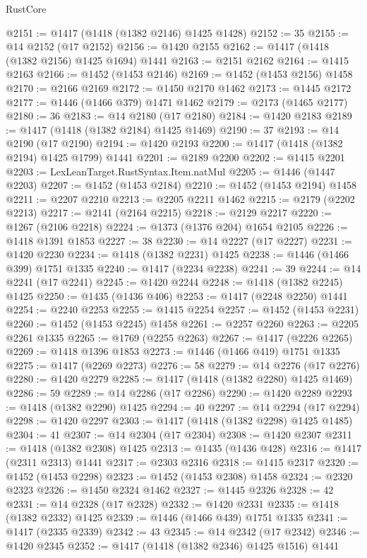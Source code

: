 \begin{lexlean}{RustCore}
\begin{coremodule}
@2151 := @1417 (@1418 (@1382 @2146) @1425 @1428)
@2152 := 35
@2155 := @14 @2152 (@17 @2152)
@2156 := @1420 @2155
@2162 := @1417 (@1418 (@1382 @2156) @1425 @1694) @1441
@2163 := @2151 @2162
@2164 := @1415 @2163
@2166 := @1452 (@1453 @2146)
@2169 := @1452 (@1453 @2156) @1458
@2170 := @2166 @2169
@2172 := @1450 @2170 @1462
@2173 := @1445 @2172
@2177 := @1446 (@1466 @379) @1471 @1462
@2179 := @2173 (@1465 @2177)
@2180 := 36
@2183 := @14 @2180 (@17 @2180)
@2184 := @1420 @2183
@2189 := @1417 (@1418 (@1382 @2184) @1425 @1469)
@2190 := 37
@2193 := @14 @2190 (@17 @2190)
@2194 := @1420 @2193
@2200 := @1417 (@1418 (@1382 @2194) @1425 @1799) @1441
@2201 := @2189 @2200
@2202 := @1415 @2201
@2203 := LexLeanTarget.RustSyntax.Item.natMul
@2205 := @1446 (@1447 @2203)
@2207 := @1452 (@1453 @2184)
@2210 := @1452 (@1453 @2194) @1458
@2211 := @2207 @2210
@2213 := @2205 @2211 @1462
@2215 := @2179 (@2202 @2213)
@2217 := @2141 (@2164 @2215)
@2218 := @2129 @2217
@2220 := @1267 (@2106 @2218)
@2224 := @1373 (@1376 @204) @1654 @2105
@2226 := @1418 @1391 @1853
@2227 := 38
@2230 := @14 @2227 (@17 @2227)
@2231 := @1420 @2230
@2234 := @1418 (@1382 @2231) @1425
@2238 := @1446 (@1466 @399) @1751 @1335
@2240 := @1417 (@2234 @2238)
@2241 := 39
@2244 := @14 @2241 (@17 @2241)
@2245 := @1420 @2244
@2248 := @1418 (@1382 @2245) @1425
@2250 := @1435 (@1436 @406)
@2253 := @1417 (@2248 @2250) @1441
@2254 := @2240 @2253
@2255 := @1415 @2254
@2257 := @1452 (@1453 @2231)
@2260 := @1452 (@1453 @2245) @1458
@2261 := @2257 @2260
@2263 := @2205 @2261 @1335
@2265 := @1769 (@2255 @2263)
@2267 := @1417 (@2226 @2265)
@2269 := @1418 @1396 @1853
@2273 := @1446 (@1466 @419) @1751 @1335
@2275 := @1417 (@2269 @2273)
@2276 := 58
@2279 := @14 @2276 (@17 @2276)
@2280 := @1420 @2279
@2285 := @1417 (@1418 (@1382 @2280) @1425 @1469)
@2286 := 59
@2289 := @14 @2286 (@17 @2286)
@2290 := @1420 @2289
@2293 := @1418 (@1382 @2290) @1425
@2294 := 40
@2297 := @14 @2294 (@17 @2294)
@2298 := @1420 @2297
@2303 := @1417 (@1418 (@1382 @2298) @1425 @1485)
@2304 := 41
@2307 := @14 @2304 (@17 @2304)
@2308 := @1420 @2307
@2311 := @1418 (@1382 @2308) @1425
@2313 := @1435 (@1436 @428)
@2316 := @1417 (@2311 @2313) @1441
@2317 := @2303 @2316
@2318 := @1415 @2317
@2320 := @1452 (@1453 @2298)
@2323 := @1452 (@1453 @2308) @1458
@2324 := @2320 @2323
@2326 := @1450 @2324 @1462
@2327 := @1445 @2326
@2328 := 42
@2331 := @14 @2328 (@17 @2328)
@2332 := @1420 @2331
@2335 := @1418 (@1382 @2332) @1425
@2339 := @1446 (@1466 @439) @1751 @1335
@2341 := @1417 (@2335 @2339)
@2342 := 43
@2345 := @14 @2342 (@17 @2342)
@2346 := @1420 @2345
@2352 := @1417 (@1418 (@1382 @2346) @1425 @1516) @1441

\end{coremodule}
\end{lexlean}
